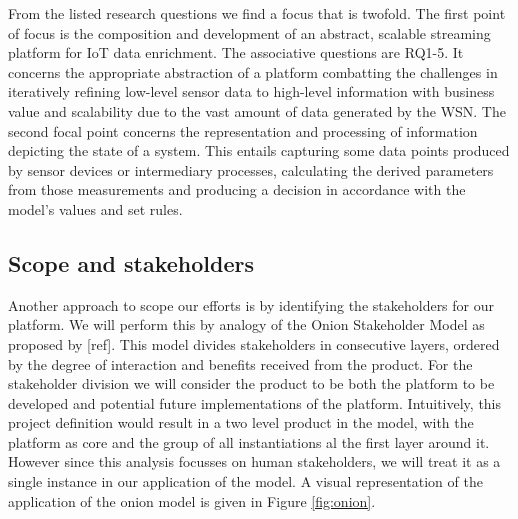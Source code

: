From the listed research questions we find a focus that is twofold. The first point of focus is the composition and development of an abstract, scalable streaming platform for IoT data enrichment. The associative questions are RQ1-5. It concerns the appropriate abstraction of a platform combatting the challenges in iteratively refining low-level sensor data to high-level information with business value and scalability due to the vast amount of data generated by the WSN.  The second focal point concerns the representation and processing of information depicting the state of a system. This entails capturing some data points produced by sensor devices or intermediary processes, calculating the derived parameters from those measurements and producing a decision in accordance with the model's values and set rules.

\subsection{Scope and stakeholders}

Another approach to scope our efforts is by identifying the stakeholders for our platform. We will perform this by analogy of the Onion Stakeholder Model as proposed by [ref]\cite{onion}. This model divides stakeholders in consecutive layers, ordered by the degree of interaction and benefits received from the product. For the stakeholder division we will consider the product to be both the platform to be developed and potential future implementations of the platform. Intuitively, this project definition would result in a two level product in the model, with the platform as core and the group of all instantiations al the first layer around it. However since this analysis focusses on human stakeholders, we will treat it as a single instance in our application of the model. A visual representation of the application of the onion model is given in Figure \ref{fig:onion}.

